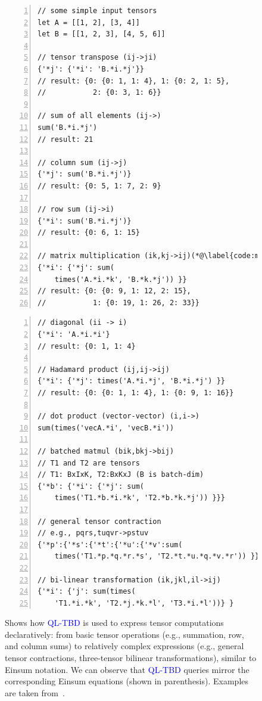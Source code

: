 \documentclass[runningheads]{llncs}
\newcommand{\lang}{\textcolor{blue}{QL-TBD}}
\begin{document}
\begin{figure}[t]
\begin{minipage}{0.5\textwidth}
\begin{lstlisting}[style=JavaScript, columns=flexible, numbers=left]
// some simple input tensors
let A = [[1, 2], [3, 4]]
let B = [[1, 2, 3], [4, 5, 6]]

// tensor transpose (ij->ji)
{'*j': {'*i': 'B.*i.*j'}}
// result: {0: {0: 1, 1: 4}, 1: {0: 2, 1: 5},
//           2: {0: 3, 1: 6}}

// sum of all elements (ij->)
sum('B.*i.*j')
// result: 21

// column sum (ij->j)
{'*j': sum('B.*i.*j')}
// result: {0: 5, 1: 7, 2: 9}

// row sum (ij->i)
{'*i': sum('B.*i.*j')}
// result: {0: 6, 1: 15}

// matrix multiplication (ik,kj->ij)(*@\label{code:matmulquery}@*)
{'*i': {'*j': sum(
    times('A.*i.*k', 'B.*k.*j')) }}
// result: {0: {0: 9, 1: 12, 2: 15},
//           1: {0: 19, 1: 26, 2: 33}}
\end{lstlisting}
\end{minipage}
\begin{minipage}{0.5\textwidth}
\begin{lstlisting}[style=JavaScript, columns=flexible, numbers=left, firstnumber=last]
// diagonal (ii -> i)
{'*i': 'A.*i.*i'}
// result: {0: 1, 1: 4}

// Hadamard product (ij,ij->ij)
{'*i': {'*j': times('A.*i.*j', 'B.*i.*j') }}
// result: {0: {0: 1, 1: 4}, 1: {0: 9, 1: 16}}

// dot product (vector-vector) (i,i->)
sum(times('vecA.*i', 'vecB.*i'))

// batched matmul (bik,bkj->bij)
// T1 and T2 are tensors
// T1: BxIxK, T2:BxKxJ (B is batch-dim)
{'*b': {'*i': {'*j': sum(
    times('T1.*b.*i.*k', 'T2.*b.*k.*j')) }}}

// general tensor contraction
// e.g., pqrs,tuqvr->pstuv
{'*p':{'*s':{'*t':{'*u':{'*v':sum(
    times('T1.*p.*q.*r.*s', 'T2.*t.*u.*q.*v.*r')) }}}}}

// bi-linear transformation (ik,jkl,il->ij)
{'*i': {'j': sum(times(
    'T1.*i.*k', 'T2.*j.*k.*l', 'T3.*i.*l'))} }
\end{lstlisting}
\end{minipage}
\caption{
Shows how \lang{} is used to express tensor computations declaratively:
from basic tensor operations (e.g., summation, row, and column sums) to relatively complex expressions
(e.g., general tensor contractions, three-tensor bilinear transformations), similar
to Einsum notation.
We can observe that \lang{} queries
mirror the corresponding Einsum equations (shown in parenthesis).
Examples are taken from~\cite{einsumblog}.
}\label{fig:tensors}
\end{figure}
\end{document}
